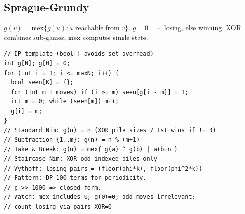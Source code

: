 \subsection{Sprague-Grundy}
$g(v) = \text{mex}\{g(u) : u \text{ reachable from } v\}$. $g=0 \implies$ losing, else winning. XOR combines sub-games, mex computes single state.
\begin{verbatim}
// DP template (bool[] avoids set overhead)
int g[N]; g[0] = 0;
for (int i = 1; i <= maxN; i++) {
  bool seen[K] = {};
  for (int m : moves) if (i >= m) seen[g[i - m]] = 1;
  int m = 0; while (seen[m]) m++;
  g[i] = m;
}
// Standard Nim: g(n) = n (XOR pile sizes / 1st wins if != 0)
// Subtraction {1..m}: g(n) = n % (m+1)
// Take & Break: g(n) = mex{ g(a) ^ g(b) | a+b=n }
// Staircase Nim: XOR odd-indexed piles only
// Wythoff: losing pairs = (floor(phi*k), floor(phi^2*k))
// Pattern: DP 100 terms for periodicity.
// g >> 1000 => closed form.
// Watch: mex includes 0; g(0)=0; add moves irrelevant;
// count losing via pairs XOR=0
\end{verbatim}
